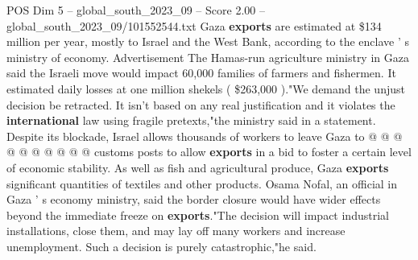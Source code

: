 \begin{textsample}{POS Dim 5 – global\_south\_2023\_09 – Score 2.00 – global\_south\_2023\_09/101552544.txt}
Gaza \textbf{exports} are estimated at \$134 million per year, mostly to Israel and the West Bank, according to the enclave ' s ministry of economy.
Advertisement The Hamas-run agriculture ministry in Gaza said the Israeli move would impact 60,000 families of farmers and fishermen.
It estimated daily losses at one million shekels ( \$263,000 )."We demand the unjust decision be retracted.
It isn't based on any real justification and it violates the \textbf{international} law using fragile pretexts,"the ministry said in a statement.
Despite its blockade, Israel allows thousands of workers to leave Gaza to @ @ @ @ @ @ @ @ @ @ customs posts to allow \textbf{exports} in a bid to foster a certain level of economic stability.
As well as fish and agricultural produce, Gaza \textbf{exports} significant quantities of textiles and other products.
Osama Nofal, an official in Gaza ' s economy ministry, said the border closure would have wider effects beyond the immediate freeze on \textbf{exports}."The decision will impact industrial installations, close them, and may lay off many workers and increase unemployment.
Such a decision is purely catastrophic,"he said.

\end{textsample}
